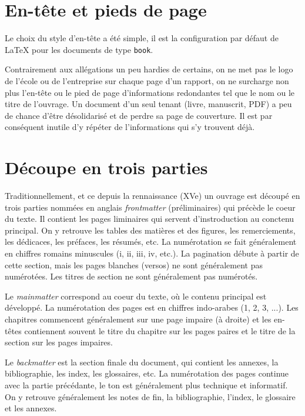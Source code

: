 \section{En-tête et pieds de page}

Le choix du style d'en-tête a été simple, il est la configuration par défaut de \LaTeX{} pour les documents de type \texttt{book}.

Contrairement aux allégations un peu hardies de certains, on ne met pas le logo de l'école ou de l'entreprise sur chaque page d'un rapport, on ne surcharge non plus l'en-tête ou le pied de page d'informations redondantes tel que le nom ou le titre de l'ouvrage. Un document d'un seul tenant (livre, manuscrit, PDF) a peu de chance d'être désolidarisé et de perdre sa page de couverture. Il est par conséquent inutile d'y répéter de l'informations qui s'y trouvent déjà.

\section{Découpe en trois parties}

Traditionnellement, et ce depuis la rennaissance (XVe) un ouvrage est découpé en trois parties nommées en anglais \emph{frontmatter} (préliminaires) qui précède le coeur du texte. Il contient les pages liminaires qui servent d'instroduction au conctenu principal. On y retrouve les tables des matières et des figures, les remerciements, les dédicaces, les préfaces, les résumés, etc. La numérotation se fait généralement en chiffres romains minuscules (i, ii, iii, iv, etc.). La pagination débute à partir de cette section, mais les pages blanches (versos) ne sont généralement pas numérotées. Les titres de section ne sont généralement pas numérotés.

Le \emph{mainmatter} correspond au coeur du texte, où le contenu principal est développé. La numérotation des pages est en chiffres indo-arabes (1, 2, 3, ...). Les chapitres commencent généralement sur une page impaire (à droite) et les en-têtes contiennent souvent le titre du chapitre sur les pages paires et le titre de la section sur les pages impaires.

Le \emph{backmatter} est la section finale du document, qui contient les annexes, la bibliographie, les index, les glossaires, etc. La numérotation des pages continue avec la partie précédante, le ton est généralement plus technique et informatif. On y retrouve généralement les notes de fin, la bibliographie, l'index, le glossaire et les annexes.


